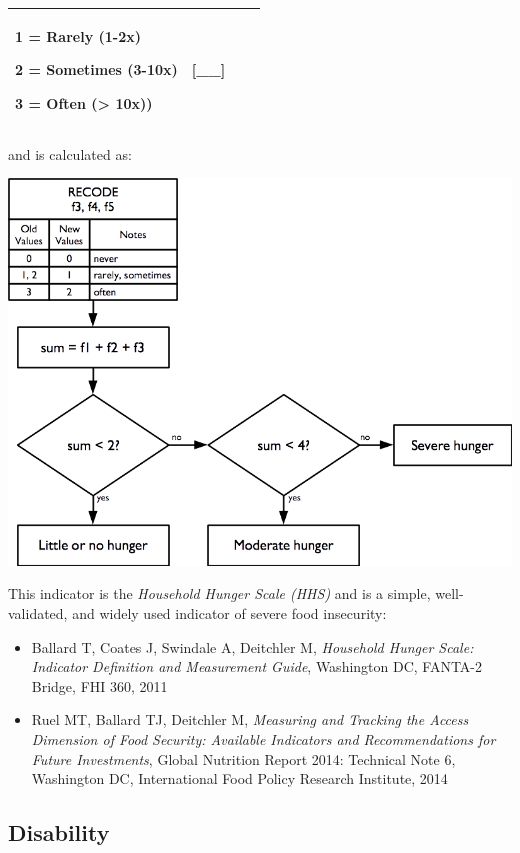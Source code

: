 \documentclass[12pt,a4paper]{book}
\theoremstyle{definition}
\theoremstyle{definition}
\theoremstyle{definition}
\theoremstyle{remark}
\begin{document}
\begin{longtable}[]{@{}llll@{}}
\begin{minipage}[t]{0.24\columnwidth}
1 = Rarely (1-2x)

2 = Sometimes (3-10x)

3 = Often (\textgreater{} 10x))\strut
\end{minipage} & \begin{minipage}[t]{0.24\columnwidth}\raggedright
{[}\_\_{]}\strut
\end{minipage}\tabularnewline
\bottomrule
\end{longtable}

and is calculated as:

\begin{center}\includegraphics{figures/indicators15} \end{center}

This indicator is the \emph{Household Hunger Scale (HHS)} and is a
simple, well-validated, and widely used indicator of severe food
insecurity:

\begin{itemize}
\item
  Ballard T, Coates J, Swindale A, Deitchler M, \emph{Household Hunger
  Scale: Indicator Definition and Measurement Guide}, Washington DC,
  FANTA-2 Bridge, FHI 360, 2011
\item
  Ruel MT, Ballard TJ, Deitchler M, \emph{Measuring and Tracking the
  Access Dimension of Food Security: Available Indicators and
  Recommendations for Future Investments}, Global Nutrition Report 2014:
  Technical Note 6, Washington DC, International Food Policy Research
  Institute, 2014
\end{itemize}

\hypertarget{disability}{%
\subsection{Disability}\label{disability}}
\end{document}
